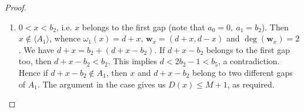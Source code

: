 \documentclass[10pt,a4paper]{amsart}
\def\deg{\operatorname{deg}}
\def\wbf{{\mathbf w}}
\begin{document}
\begin{proof}
\begin{enumerate}
\begin{enumerate}[\((\text{b}1)\)]
   $$\delta_1(\wbf_x) = \delta_1(x) \leq  2+ \left\lfloor \frac{x-b}{b_2} \right\rfloor \leq  2+ \left\lfloor \frac{x-b_3-1}{b_2} \right\rfloor \leq 2+ \left\lfloor \frac{x-b_3-1}{\epsilon'} \right\rfloor.$$
   This implies
   $$D(x) \leq   \left\lceil \frac{b_4 - x}{\epsilon'} \right\rceil + \left\lfloor \frac{x-b_3 -1}{\epsilon'} \right\rfloor \leq  \left\lceil \frac{b_4-b_3 -1}{\epsilon'} \right\rceil = \left\lfloor \frac{\lambda_i}{\epsilon'} \right\rfloor \le M.$$
     \end{enumerate}
     \item $0< x< b_2$, i.e. $x$ belongs to the first gap (note that $a_0 = 0, \ a_1 = b_2$). Then $x\not\in \langle A_1\rangle$, whence $\omega_1(x) =d+x$, $\wbf_x = (d+x, d-x)$ and $\deg(\wbf_x) = 2$. We have $d+ x = b_2 + (d+x-b_2)$. If $d+x-b_2$ belongs to the first gap too, then $d+x-b_2 < b_2$. This implies $d< 2b_2 - 1< b_5$, a contradiction. Hence if $d+x-b_2\not\in A_1$, then $x$ and $d+x-b_2$ belong to two different gaps of $A_1$. The argument in the case  gives us $D(x)\leq M + 1$, as required. 
 \end{enumerate}
\end{proof}
\end{document}

